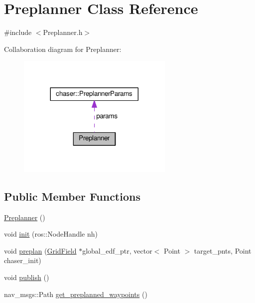 \hypertarget{class_preplanner}{}\section{Preplanner Class Reference}
\label{class_preplanner}


{\ttfamily \#include $<$Preplanner.\+h$>$}



Collaboration diagram for Preplanner\+:
\nopagebreak
\begin{figure}[H]
\begin{center}
\leavevmode
\includegraphics[width=212pt]{class_preplanner__coll__graph}
\end{center}
\end{figure}
\subsection*{Public Member Functions}
\begin{DoxyCompactItemize}
\item 
\hyperlink{class_preplanner_a4314b705278a0e3e070d5389dbb8196e}{Preplanner} ()
\item 
void \hyperlink{class_preplanner_aecde07364cbd05e2e46c95f4f5fd4951}{init} (ros\+::\+Node\+Handle nh)
\item 
void \hyperlink{class_preplanner_a6f0b709012500a44679facf0e18b985a}{preplan} (\hyperlink{struct_grid_field}{Grid\+Field} $\ast$global\+\_\+edf\+\_\+ptr, vector$<$ Point $>$ target\+\_\+pnts, Point chaser\+\_\+init)
\item 
void \hyperlink{class_preplanner_a35f3bfb85ba14d7f0c72bda1522df69e}{publish} ()
\item 
nav\+\_\+msgs\+::\+Path \hyperlink{class_preplanner_a1debbaa8e7ee64b2c22c514f89801cd1}{get\+\_\+preplanned\+\_\+waypoints} ()
\end{DoxyCompactItemize}

